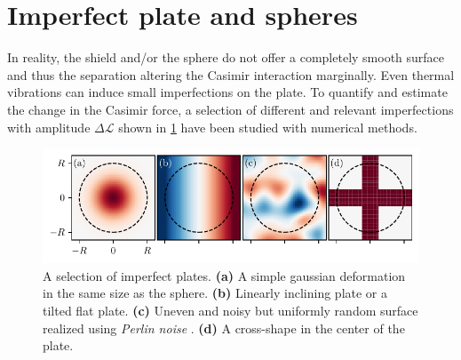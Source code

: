 \section{Imperfect plate and spheres}
\label{sec:3:imperfect-plates}

In reality, the shield and/or the sphere do not offer a completely smooth surface and thus the separation altering the Casimir interaction marginally.
Even thermal vibrations can induce small imperfections on the plate.
To quantify and estimate the change in the Casimir force, a selection of different and relevant imperfections with amplitude $\Delta \mathscr{L}$ shown in \cref{fig:3:imperfect-plates} have been studied with numerical methods.
\begin{figure}[!htbp]
  \centering
  \includegraphics[width=\textwidth]{../figures/casimir/imperfect-plates-advanced.pdf}
  \caption{A selection of imperfect plates. \textbf{(a)} A simple gaussian deformation in the same size as the sphere. \textbf{(b)} Linearly inclining plate or a tilted flat plate. \textbf{(c)} Uneven and noisy but uniformly random surface realized using \textit{Perlin noise} \cite{Perlin_1985}. \textbf{(d)} A cross-shape in the center of the plate.}
  \label{fig:3:imperfect-plates}
\end{figure}
